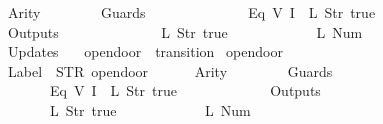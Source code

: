 \begin{isabellebody}
\ \ \ \ \ \ Arity\ {\isacharequal}\ {}{\isacharcomma}\isanewline
\ \ \ \ \ \ Guards\ {\isacharequal}\ {\isacharbrackleft}\isanewline
\ \ \ \ \ \ \ \ \ \ \ \ {\isacharparenleft}Eq\ {\isacharparenleft}V\ {\isacharparenleft}I\ {}{\isacharparenright}{\isacharparenright}\ {\isacharparenleft}L\ {\isacharparenleft}Str\ {\isacharprime}{\isacharprime}true{\isacharprime}{\isacharprime}{\isacharparenright}{\isacharparenright}{\isacharparenright}\isanewline
\ \ \ \ \ \ {\isacharbrackright}{\isacharcomma}\isanewline
\ \ \ \ \ \ Outputs\ {\isacharequal}\ {\isacharbrackleft}\isanewline
\ \ \ \ \ \ \ \ \ \ \ \ {\isacharparenleft}L\ {\isacharparenleft}Str\ {\isacharprime}{\isacharprime}true{\isacharprime}{\isacharprime}{\isacharparenright}{\isacharparenright}{\isacharcomma}\isanewline
\ \ \ \ \ \ \ \ \ \ \ \ {\isacharparenleft}L\ {\isacharparenleft}Num\ {}{\isacharparenright}{\isacharparenright}\isanewline
\ \ \ \ \ \ {\isacharbrackright}{\isacharcomma}\isanewline
\ \ \ \ \ \ Updates\ {\isacharequal}\ {\isacharbrackleft}{\isacharbrackright}\isanewline
{\isasymrparr}{\isachardoublequoteclose}\isanewline
\isanewline
{}\isamarkupfalse%
\ {\isachardoublequoteopen}opendoor{}{\isachardoublequoteclose}\ {\isacharcolon}{\isacharcolon}\ {\isachardoublequoteopen}transition{\isachardoublequoteclose}\ \isanewline
{\isachardoublequoteopen}opendoor{}\ {\isasymequiv}\ {\isasymlparr}\isanewline
\ \ \ \ \ \ Label\ {\isacharequal}\ STR\ {\isacharprime}{\isacharprime}opendoor{\isacharprime}{\isacharprime}{\isacharcomma}\isanewline
\ \ \ \ \ \ Arity\ {\isacharequal}\ {}{\isacharcomma}\isanewline
\ \ \ \ \ \ Guards\ {\isacharequal}\ {\isacharbrackleft}\isanewline
\ \ \ \ \ \ \ \ \ \ \ \ {\isacharparenleft}Eq\ {\isacharparenleft}V\ {\isacharparenleft}I\ {}{\isacharparenright}{\isacharparenright}\ {\isacharparenleft}L\ {\isacharparenleft}Str\ {\isacharprime}{\isacharprime}true{\isacharprime}{\isacharprime}{\isacharparenright}{\isacharparenright}{\isacharparenright}\isanewline
\ \ \ \ \ \ {\isacharbrackright}{\isacharcomma}\isanewline
\ \ \ \ \ \ Outputs\ {\isacharequal}\ {\isacharbrackleft}\isanewline
\ \ \ \ \ \ \ \ \ \ \ \ {\isacharparenleft}L\ {\isacharparenleft}Str\ {\isacharprime}{\isacharprime}true{\isacharprime}{\isacharprime}{\isacharparenright}{\isacharparenright}{\isacharcomma}\isanewline
\ \ \ \ \ \ \ \ \ \ \ \ {\isacharparenleft}L\ {\isacharparenleft}Num\ {}{\isacharparenright}{\isacharparenright}\isanewline
\ \ \ \ \ \ {\isacharbrackright}{\isacharcomma}\isanewline

\end{isabellebody}
